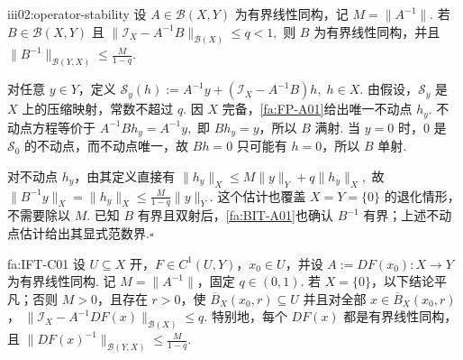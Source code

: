 \begin{FAProposition}[C][可逆算子的压缩稳定性]{iii02:operator-stability}
设 \(\displaystyle A\in\mathcal B(X,Y)\) 为有界线性同构，记 \(\displaystyle M=\|A^{-1}\|\). 若 \(\displaystyle B\in\mathcal B(X,Y)\) 且
\(\displaystyle \|\mathcal I_X-A^{-1}B\|_{\mathcal B(X)} \leqslant q<1,\)
则 \(\displaystyle B\) 为有界线性同构，并且
\(\displaystyle \|B^{-1}\|_{\mathcal B(Y,X)} \leqslant \frac{M}{1-q}.\)
\end{FAProposition}

\begin{FAProof}
对任意 \(\displaystyle y\in Y\)，定义
\(\displaystyle \mathcal S_y(h) := A^{-1}y+(\mathcal I_X-A^{-1}B)h, \; h\in X.\)
由假设，\(\displaystyle\mathcal S_y\) 是 \(\displaystyle X\) 上的压缩映射，常数不超过 \(\displaystyle q\). 因 \(\displaystyle X\) 完备，\autoref{fa:FP-A01}给出唯一不动点 \(\displaystyle h_y\). 不动点方程等价于
\(\displaystyle A^{-1}Bh_y=A^{-1}y,\)
即 \(\displaystyle Bh_y=y\)，所以 \(\displaystyle B\) 满射. 当 \(\displaystyle y=0\) 时，\(\displaystyle0\) 是 \(\displaystyle\mathcal S_0\) 的不动点，而不动点唯一，故 \(\displaystyle Bh=0\) 只可能有 \(\displaystyle h=0\)，所以 \(\displaystyle B\) 单射.

对不动点 \(\displaystyle h_y\)，由其定义直接有
\(\displaystyle \|h_y\|_X \leqslant M\|y\|_Y+q\|h_y\|_X,\)
故
\(\displaystyle \|B^{-1}y\|_X = \|h_y\|_X \leqslant \frac{M}{1-q}\|y\|_Y.\)
这个估计也覆盖 \(\displaystyle X=Y=\{0\}\) 的退化情形，不需要除以 \(\displaystyle M\). 已知 \(\displaystyle B\) 有界且双射后，\autoref{fa:BIT-A01}也确认 \(\displaystyle B^{-1}\) 有界；上述不动点估计给出其显式范数界.\hfill\(\square\)

\end{FAProof}

\begin{FATheorem}[C][局部可逆性半径工具]{fa:IFT-C01}
设 \(\displaystyle U\subseteq X\) 开，\(\displaystyle F\in C^1(U,Y)\)，\(\displaystyle x_0\in U\)，并设
\(\displaystyle A:=DF(x_0):X\to Y\)
为有界线性同构. 记 \(\displaystyle M=\|A^{-1}\|\)，固定 \(\displaystyle q\in(0,1)\). 若 \(\displaystyle X=\{0\}\)，以下结论平凡；否则 \(\displaystyle M>0\)，且存在 \(\displaystyle r>0\)，使
\(\displaystyle \overline B_X(x_0,r) \subseteq U\)
并且对全部 \(\displaystyle x\in\overline B_X(x_0,r)\)，
\(\displaystyle \|\mathcal I_X-A^{-1}DF(x)\|_{\mathcal B(X)} \leqslant q.\)
特别地，每个 \(\displaystyle DF(x)\) 都是有界线性同构，且
\(\displaystyle \|DF(x)^{-1}\|_{\mathcal B(Y,X)} \leqslant \frac{M}{1-q}.\)
\end{FATheorem}

